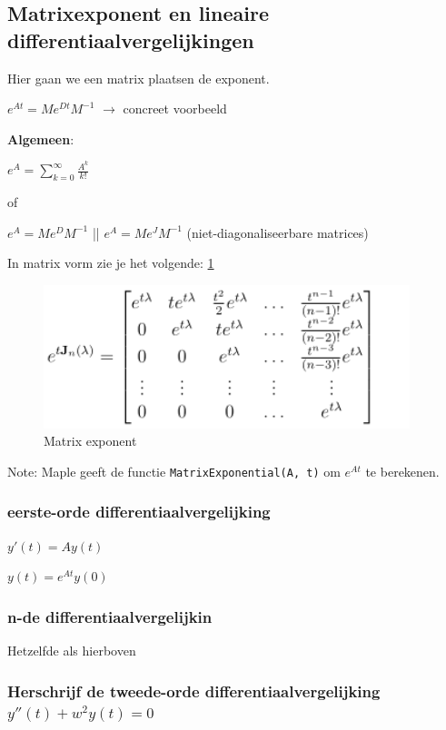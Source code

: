 \documentclass[a4paper]{report}
\begin{document}
\subsection{Matrixexponent en lineaire differentiaalvergelijkingen}

Hier gaan we een matrix plaatsen de exponent.

$e^{At} = M e^{Dt} M^{-1}$ $\rightarrow$ concreet voorbeeld

\textbf{Algemeen}:

$e^{A} = \sum_{k=0}^{\infty} \frac{A^k}{k!}$

of

$e^{A} = M e^{D} M^{-1}$ || $e^{A} = M e^{J} M^{-1}$ (niet-diagonaliseerbare matrices)

In matrix vorm zie je het volgende: \ref{fig:matrix_expo}

\begin{figure}[H]
	\begin{center}
		\includegraphics[width=0.95\textwidth]{./images/matrix_expo.png}
	\end{center}
	\caption{Matrix exponent}
	\label{fig:matrix_expo}
\end{figure}

Note: Maple geeft de functie \texttt{MatrixExponential(A, t)} om $e^{At}$ te berekenen.

\subsubsection{eerste-orde differentiaalvergelijking}

$y'(t) = Ay(t)$

$y(t) = e^{At} y(0)$

\subsubsection{n-de differentiaalvergelijkin}

Hetzelfde als hierboven

\subsubsection{Herschrijf de tweede-orde differentiaalvergelijking $y''(t) + w^2 y(t) = 0$}
\end{document}
